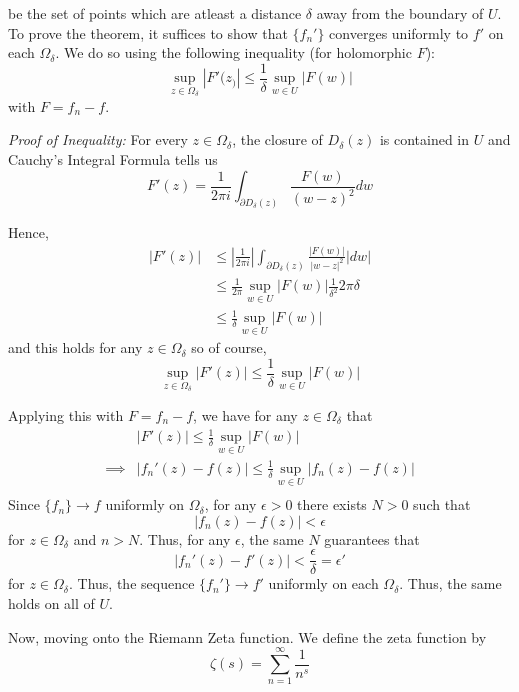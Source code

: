 \documentclass{article}
\begin{document}
be the set of points which are atleast a distance $\delta$ away from the boundary of $U$. To prove the theorem, it suffices to show that $\{f_n'\}$ converges uniformly to $f'$ on each $\Omega_{\delta}$. We do so using the following inequality (for holomorphic $F$):
\[ \sup_{z \in \Omega_{\delta}} \left| F'(z_) \right| \leq \frac{1}{\delta} \sup_{w \in U} \left| F(w) \right| \]
with $F = f_n - f$.

\begin{dottedbox}
  \emph{Proof of Inequality:}
  \vskip 0.25cm
  For every $z \in \Omega_{\delta}$, the closure of $D_{\delta}(z)$ is contained in $U$ and Cauchy's Integral Formula tells us 
  \[ F'(z) = \frac{1}{2\pi i} \int_{\partial D_{\delta}(z)} \frac{F(w)}{(w-z)^2} dw \]

  Hence,
  \begin{align}
    |F'(z)| &\leq \left| \frac{1}{2\pi i} \right| \int_{\partial D_{\delta}(z)} \frac{\left| F(w) \right|}{\left| w - z \right|^2} |dw| \\
    &\leq \frac{1}{2\pi} \sup_{w \in U} \left| F(w) \right| \frac{1}{\delta^2} 2\pi \delta \\
    &\leq \frac{1}{\delta} \sup_{w \in U} \left| F(w) \right|
  \end{align}
  and this holds for any $z \in \Omega_{\delta}$ so of course, 
  \[ \boxed{\sup_{z \in \Omega_{\delta}} \left| F'(z) \right| \leq \frac{1}{\delta} \sup_{w \in U} \left| F(w) \right|} \]
\end{dottedbox}

\vskip 0.25cm
Applying this with $F = f_n - f$, we have for any $z \in \Omega_{\delta}$ that 
\begin{align*}
  &\left| F'(z) \right| \leq \frac{1}{\delta} \sup_{w \in U} \left| F(w) \right| \\
  \implies&\left| f_n'(z) - f(z) \right| \leq \frac{1}{\delta} \sup_{w \in U} \left| f_n(z) - f(z) \right| \\
\end{align*}
Since $\{f_n\} \rightarrow f$ uniformly on $\Omega_{\delta}$, for any $\epsilon > 0$ there exists $N > 0$ such that 
\[ \left| f_n(z) - f(z) \right| < \epsilon \]
for $z \in \Omega_{\delta}$ and $n > N$. Thus, for any $\epsilon$, the same $N$ guarantees that 
\[ \left| f_n'(z) - f'(z) \right| < \frac{\epsilon}{\delta} = \epsilon' \]
for $z \in \Omega_{\delta}$. Thus, the sequence $\{f_n'\} \rightarrow f'$ uniformly on each $\Omega_{\delta}$. Thus, the same holds on all of $U$.

\vskip 1cm
Now, moving onto the Riemann Zeta function. We define the zeta function by 
\[ \zeta(s) = \sum_{n = 1}^{\infty} \frac{1}{n^s} \]
\end{document}

